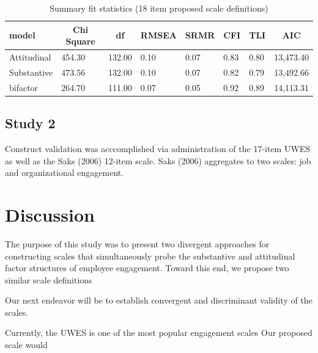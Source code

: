 \documentclass[
  english,
  man]{apa7}
\begin{document}
\begin{table}[tbp]

\begin{center}
\begin{threeparttable}

\caption{\label{tab:fitmeasures}Summary fit statistics (18 item proposed scale definitions)}

\begin{tabular}{llllllll}
\toprule
model & \multicolumn{1}{c}{Chi Square} & \multicolumn{1}{c}{df} & \multicolumn{1}{c}{RMSEA} & \multicolumn{1}{c}{SRMR} & \multicolumn{1}{c}{CFI} & \multicolumn{1}{c}{TLI} & \multicolumn{1}{c}{AIC}\\
\midrule
Attitudinal & 454.30 & 132.00 & 0.10 & 0.07 & 0.83 & 0.80 & 13,473.40\\
Substantive & 473.56 & 132.00 & 0.10 & 0.07 & 0.82 & 0.79 & 13,492.66\\
bifactor & 264.70 & 111.00 & 0.07 & 0.05 & 0.92 & 0.89 & 14,113.31\\
\bottomrule
\end{tabular}

\end{threeparttable}
\end{center}

\end{table}

\hypertarget{study-2}{%
\subsection{Study 2}\label{study-2}}

Construct validation was acccomplished via administration of the 17-item UWES as well as the Saks (2006) 12-item scale. Saks (2006) aggregates to two scales: job and organizational engagement.

\hypertarget{discussion}{%
\section{Discussion}\label{discussion}}

The purpose of this study was to present two divergent approaches for constructing scales that simultaneously probe the substantive and attitudinal factor structures of employee engagement. Toward this end, we propose two similar scale definitions

Our next endeavor will be to establish convergent and discriminant validity of the scales.

Currently, the UWES is one of the most popular engagement scales
Our proposed scale would
\end{document}
